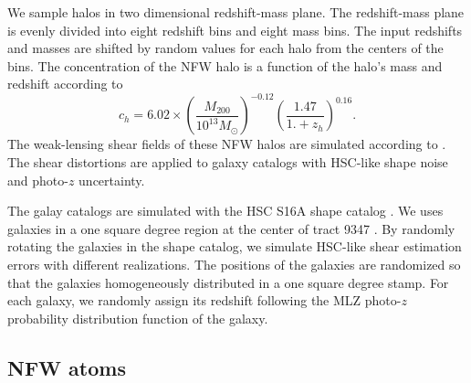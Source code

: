 \documentclass[twocolumn]{aastex62}
\begin{document}
We sample halos in two dimensional redshift-mass plane. The redshift-mass plane is evenly divided into eight redshift bins
and eight mass bins. The input redshifts and masses are shifted by random values for each halo from the centers
of the bins.
The concentration of the NFW halo is a function of the halo's mass and redshift according to
\citet{c-M_Magneticum-Ragagnin2019}
\begin{equation}
c_{h}=6.02\times(\frac{M_{200}}{10^{13} M_{\odot}})^{-0.12}(\frac{1.47}{1.+z_h})^{0.16}.
\end{equation}
The weak-lensing shear fields of these NFW halos are simulated according to \citet{haloModel-TJ2003-3pt}. The shear
distortions are applied to galaxy catalogs with HSC-like shape noise and photo-$z$ uncertainty.

The galay catalogs are simulated with the HSC S16A shape catalog \citep{HSC1-catalog}.
We uses galaxies in a one square degree region at the center of tract 9347 \citep{HSC1-data}.
By randomly rotating the galaxies in the shape catalog, we simulate HSC-like shear estimation errors
with different realizations.
The positions of the galaxies are randomized so that the galaxies homogeneously distributed in a one square degree
stamp.
For each galaxy, we randomly assign its redshift following the MLZ photo-$z$ probability distribution function
\citep{HSC1-photoz} of the galaxy.

\subsection{NFW atoms}
\label{subsec:test-nfw}
\end{document}
